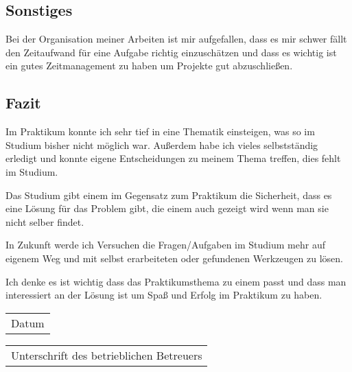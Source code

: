 \documentclass[pdftex,12pt,a4paper]{scrartcl}
\begin{document}
\subsection{Sonstiges}
Bei der Organisation meiner Arbeiten ist mir aufgefallen, dass es mir schwer fällt den Zeitaufwand für eine Aufgabe richtig einzuschätzen und dass es wichtig ist ein gutes Zeitmanagement zu haben um Projekte gut abzuschließen.
\subsection{Fazit}
Im Praktikum konnte ich sehr tief in eine Thematik einsteigen, was so im Studium bisher nicht möglich war. Außerdem habe ich vieles selbstständig erledigt und konnte eigene Entscheidungen zu meinem Thema treffen, dies fehlt im Studium.

Das Studium gibt einem im Gegensatz zum Praktikum die Sicherheit, dass es eine Lösung für das Problem gibt, die einem auch gezeigt wird wenn man sie nicht selber findet.

In Zukunft werde ich Versuchen die Fragen/Aufgaben im Studium mehr auf eigenem Weg und mit selbst erarbeiteten oder gefundenen Werkzeugen zu lösen.

Ich denke es ist wichtig dass das Praktikumsthema zu einem passt und dass man interessiert an der Lösung ist um Spaß und Erfolg im Praktikum zu haben.

\appendix


\noindent %

\begin{tabular}{p{4cm}}\hline
    \centering\small Datum
\end{tabular}\hfill
\begin{tabular}{p{8cm}}\hline
    \centering\small Unterschrift des betrieblichen Betreuers
\end{tabular}
\end{document}
